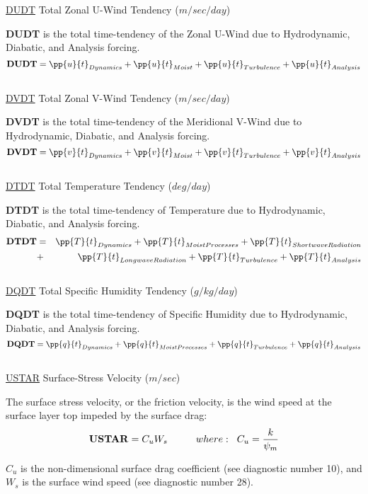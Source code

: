 \noindent
{ \underline {DUDT} Total Zonal U-Wind Tendency  ($m/sec/day$) }

\noindent
{\bf DUDT} is the total time-tendency of the Zonal U-Wind due to Hydrodynamic, Diabatic,
and Analysis forcing.
\[
{\bf DUDT} = \pp{u}{t}_{Dynamics} + \pp{u}{t}_{Moist} + \pp{u}{t}_{Turbulence} + \pp{u}{t}_{Analysis} 
\]
\\

\noindent
{ \underline {DVDT} Total Zonal V-Wind Tendency  ($m/sec/day$) }

\noindent
{\bf DVDT} is the total time-tendency of the Meridional V-Wind due to Hydrodynamic, Diabatic,
and Analysis forcing.
\[
{\bf DVDT} = \pp{v}{t}_{Dynamics} + \pp{v}{t}_{Moist} + \pp{v}{t}_{Turbulence} + \pp{v}{t}_{Analysis} 
\]
\\

\noindent
{ \underline {DTDT} Total Temperature Tendency  ($deg/day$) }

\noindent
{\bf DTDT} is the total time-tendency of Temperature due to Hydrodynamic, Diabatic,
and Analysis forcing.
\begin{eqnarray*}
{\bf DTDT} & = & \pp{T}{t}_{Dynamics} + \pp{T}{t}_{Moist Processes} + \pp{T}{t}_{Shortwave Radiation} \\
           & + & \pp{T}{t}_{Longwave Radiation} + \pp{T}{t}_{Turbulence} + \pp{T}{t}_{Analysis} 
\end{eqnarray*}
\\

\noindent
{ \underline {DQDT} Total Specific Humidity Tendency  ($g/kg/day$) }

\noindent
{\bf DQDT} is the total time-tendency of Specific Humidity due to Hydrodynamic, Diabatic,
and Analysis forcing.
\[
{\bf DQDT} = \pp{q}{t}_{Dynamics} + \pp{q}{t}_{Moist Processes} 
+ \pp{q}{t}_{Turbulence} + \pp{q}{t}_{Analysis} 
\]
\\
   
\noindent
{ \underline {USTAR}  Surface-Stress Velocity ($m/sec$) }

\noindent
The surface stress velocity, or the friction velocity, is the wind speed at 
the surface layer top impeded by the surface drag:
\[
{\bf USTAR} = C_uW_s \hspace{1cm}where: \hspace{.2cm} 
C_u = {k \over {\psi_m} }
\]

\noindent
$C_u$ is the non-dimensional surface drag coefficient (see diagnostic
number 10), and $W_s$ is the surface wind speed (see diagnostic number 28).
 
